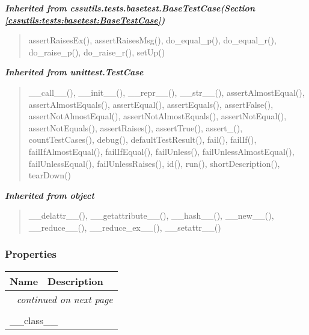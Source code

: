 \large{\textbf{\textit{Inherited from cssutils.tests.basetest.BaseTestCase\textit{(Section \ref{cssutils:tests:basetest:BaseTestCase})}}}}

\begin{quote}
assertRaisesEx(), assertRaisesMsg(), do\_equal\_p(), do\_equal\_r(), do\_raise\_p(), do\_raise\_r(), setUp()
\end{quote}

\large{\textbf{\textit{Inherited from unittest.TestCase}}}

\begin{quote}
\_\_call\_\_(), \_\_init\_\_(), \_\_repr\_\_(), \_\_str\_\_(), assertAlmostEqual(), assertAlmostEquals(), assertEqual(), assertEquals(), assertFalse(), assertNotAlmostEqual(), assertNotAlmostEquals(), assertNotEqual(), assertNotEquals(), assertRaises(), assertTrue(), assert\_(), countTestCases(), debug(), defaultTestResult(), fail(), failIf(), failIfAlmostEqual(), failIfEqual(), failUnless(), failUnlessAlmostEqual(), failUnlessEqual(), failUnlessRaises(), id(), run(), shortDescription(), tearDown()
\end{quote}

\large{\textbf{\textit{Inherited from object}}}

\begin{quote}
\_\_delattr\_\_(), \_\_getattribute\_\_(), \_\_hash\_\_(), \_\_new\_\_(), \_\_reduce\_\_(), \_\_reduce\_ex\_\_(), \_\_setattr\_\_()
\end{quote}


  \subsubsection{Properties}

    \vspace{-1cm}
\hspace{\varindent}\begin{longtable}{|p{\varnamewidth}|p{\vardescrwidth}|l}
\cline{1-2}
\cline{1-2} \centering \textbf{Name} & \centering \textbf{Description}& \\
\cline{1-2}
\endhead\cline{1-2}\multicolumn{3}{r}{\small\textit{continued on next page}}\\\endfoot\cline{1-2}
\endlastfoot\multicolumn{2}{|l|}{\textit{Inherited from object}}\\
\multicolumn{2}{|p{\varwidth}|}{\raggedright \_\_class\_\_}\\
\cline{1-2}
\end{longtable}

